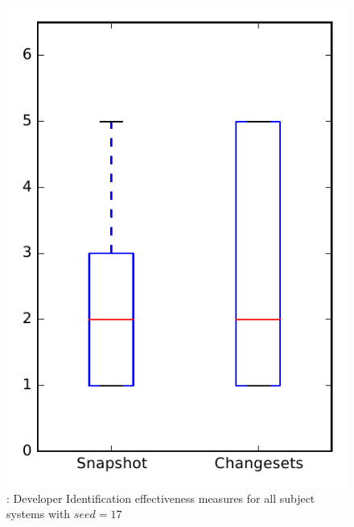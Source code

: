 
\begin{figure}
\centering
\includegraphics[height=0.4\textheight]{figures/dit_seed/rq1_overview_17}
\caption{\rtwo: Developer Identification effectiveness measures for all subject systems with $seed=17$}
\label{fig:dit_seed:rq1:overview}
\end{figure}
